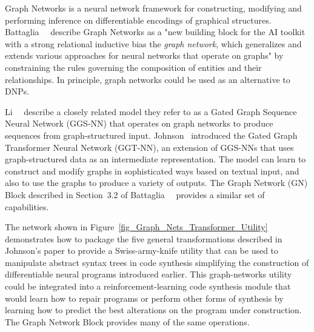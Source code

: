

Graph Networks is a neural network framework for constructing, modifying and performing inference on differentiable encodings of graphical structures. Battaglia~\etal{}~\cite{BattagliaetalCoRR-18} describe Graph Networks as a "new building block for the AI toolkit with a strong relational inductive bias the {\it{graph network}}, which generalizes and extends various approaches for neural networks that operate on graphs" by constraining the rules governing the composition of entities and their relationships. In principle, graph networks could be used as an alternative to DNPs.

Li~\etal{}~\cite{LietalICLR-18} describe a closely related model they refer to as a Gated Graph Sequence Neural Network (GGS-NN) that operates on graph networks to produce sequences from graph-structured input. Johnson~\cite{JohnsonICLR-17} introduced the Gated Graph Transformer Neural Network (GGT-NN), an extension of GGS-NNs that uses graph-structured data as an intermediate representation. The model can learn to construct and modify graphs in sophisticated ways based on textual input, and also to use the graphs to produce a variety of outputs. The Graph Network (GN) Block described in Section~3.2 of Battaglia~\etal{}~\cite{BattagliaetalCoRR-18} provides a similar set of capabilities.

The network shown in Figure~\ref{fig_Graph_Nets_Transformer_Utility} demonstrates how to package the five general transformations described in Johnson's paper to provide a Swiss-army-knife utility that can be used to manipulate abstract syntax trees in code synthesis simplifying the construction of differentiable neural programs introduced earlier. This graph-networks utility could be integrated into a reinforcement-learning code synthesis module that would learn how to repair programs or perform other forms of synthesis by learning how to predict the best alterations on the program under construction. The Graph Network Block provides many of the same operations.


